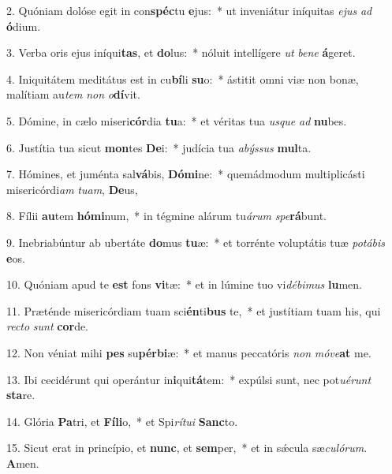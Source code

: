 2. Quóniam dolóse egit in con\textbf{spéc}tu \textbf{e}jus:~*  ut inveniátur iníquitas \textit{e}\textit{jus} \textit{ad} \textbf{ó}dium.\

3. Verba oris ejus iníqui\textbf{tas}, et \textbf{do}lus:~*  nóluit intellígere \textit{ut} \textit{be}\textit{ne} \textbf{á}geret.\

4. Iniquitátem meditátus est in cu\textbf{bí}li \textbf{su}o:~*  ástitit omni viæ non bonæ, malítiam au\textit{tem} \textit{non} \textit{o}\textbf{dí}vit.\

5. Dómine, in cælo miseri\textbf{cór}dia \textbf{tu}a:~*  et véritas tua \textit{us}\textit{que} \textit{ad} \textbf{nu}bes.\

6. Justítia tua sicut \textbf{mon}tes \textbf{De}i:~*  judícia tua \textit{a}\textit{býs}\textit{sus} \textbf{mul}ta.\

7. Hómines, et juménta sal\textbf{vá}bis, \textbf{Dó}\textbf{mi}ne:~*  quemádmodum multiplicásti misericórdi\textit{am} \textit{tu}\textit{am}, \textbf{De}us,\

8. Fílii \textbf{au}tem \textbf{hó}\textbf{mi}num,~*  in tégmine alárum tu\textit{á}\textit{rum} \textit{spe}\textbf{rá}bunt.\

9. Inebriabúntur ab ubertáte \textbf{do}mus \textbf{tu}æ:~*  et torrénte voluptátis tuæ \textit{po}\textit{tá}\textit{bis} \textbf{e}os.\

10. Quóniam apud te \textbf{est} fons \textbf{vi}tæ:~*  et in lúmine tuo vi\textit{dé}\textit{bi}\textit{mus} \textbf{lu}men.\

11. Præténde misericórdiam tuam sci\textbf{én}ti\textbf{bus} te,~*  et justítiam tuam his, qui \textit{rec}\textit{to} \textit{sunt} \textbf{cor}de.\

12. Non véniat mihi \textbf{pes} su\textbf{pér}\textbf{bi}æ:~*  et manus peccatóris \textit{non} \textit{mó}\textit{ve}\textbf{at} me.\

13. Ibi cecidérunt qui operántur in\textbf{i}qui\textbf{tá}tem:~*  expúlsi sunt, nec pot\textit{u}\textit{é}\textit{runt} \textbf{sta}re.\

14. Glória \textbf{Pa}tri, et \textbf{Fí}\textbf{li}o,~*  et Spi\textit{rí}\textit{tu}\textit{i} \textbf{Sanc}to.\

15. Sicut erat in princípio, et \textbf{nunc}, et \textbf{sem}per,~*  et in sǽcula sæ\textit{cu}\textit{ló}\textit{rum}. \textbf{A}men.\

